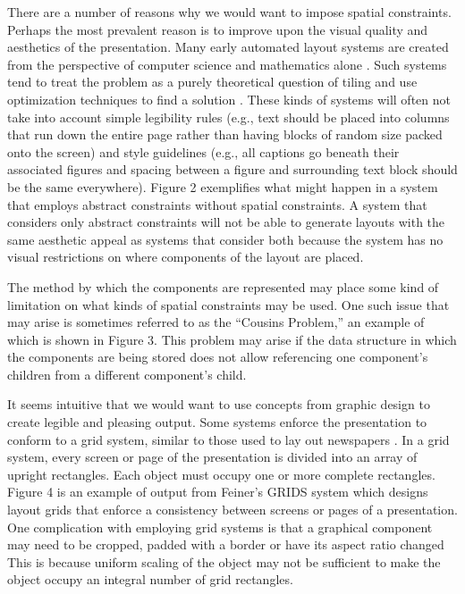       There are a number of reasons why we would want to impose spatial
      constraints. Perhaps the most prevalent reason is to improve upon the
      visual quality and aesthetics of the presentation. Many early automated
      layout systems are created from the perspective of computer science and
      mathematics alone \citep{beach-1}. Such systems tend to treat the problem
      as a purely theoretical question of tiling and use optimization techniques
      to find a solution \citep{luders-1}. These kinds of systems will often not
      take into account simple legibility rules (e.g., text should be placed into
      columns that run down the entire page rather than having blocks of random
      size packed onto the screen) and style guidelines (e.g., all captions go
      beneath their associated figures and spacing between a figure and
      surrounding text block should be the same everywhere). Figure 2 exemplifies
      what might happen in a system that employs abstract constraints without
      spatial constraints. A system that considers only abstract constraints will
      not be able to generate layouts with the same aesthetic appeal as systems
      that consider both because the system has no visual restrictions on where
      components of the layout are placed.

      The method by which the components are represented may place some kind of
      limitation on what kinds of spatial constraints may be used. One such issue
      that may arise is sometimes referred to as the “Cousins Problem,” an
      example of which is shown in Figure 3. This problem may arise if the data
      structure in which the components are being stored does not allow
      referencing one component’s children from a different component’s child.

      It seems intuitive that we would want to use concepts from graphic design
      to create legible and pleasing output. Some systems enforce the
      presentation to conform to a grid system, similar to those used to lay out
      newspapers \citep{muller-1,hurlburt-1}. In a grid system, every screen or
      page of the presentation is divided into an array of upright rectangles.
      Each object must occupy one or more complete rectangles. Figure 4 is an
      example of output from Feiner’s GRIDS system \citep{feiner-1} which designs
      layout grids that enforce a consistency between screens or pages of a
      presentation. One complication with employing grid systems is that a
      graphical component may need to be cropped, padded with a border or have
      its aspect ratio changed This is because uniform scaling of the object may
      not be sufficient to make the object occupy an integral number of grid
      rectangles.

